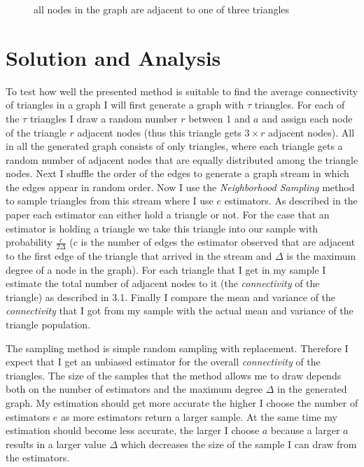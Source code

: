 \documentclass[12pt,twoside,a4paper]{report}
\begin{document}
\begin{figure}
\caption{all nodes in the graph are adjacent to one of three triangles}
\end{figure}
\section{Solution and Analysis}
To test how well the presented method is suitable to find the average connectivity of triangles in a graph I will first generate a graph with $\tau$ triangles. For each of the $\tau$ triangles I draw a random number $r$ between 1 and $a$ and assign each node of the triangle $r$ adjacent nodes (thus this triangle gets $3\times r$ adjacent nodes). All in all the generated graph consists of only triangles, where each triangle gets a random number of adjacent nodes that are equally distributed among the triangle nodes. Next I shuffle the order of the edges to generate a graph stream in which the edges appear in random order. Now I use the \textit{Neighborhood Sampling} method to sample triangles from this stream where I use $e$ estimators. As described in the paper each estimator can either hold a triangle or not. For the case that an estimator is holding a triangle we take this triangle into our sample with probability $\frac{c}{2\Delta}$ ($c$ is the number of edges the	 estimator observed that are adjacent to the first edge of the triangle that arrived in the stream and $\Delta$ is the maximum degree of a node in the graph). For each triangle that I get in my sample I estimate the total number of adjacent nodes to it (the \textit{connectivity} of the triangle) as described in 3.1. Finally I compare the mean and variance of the \textit{connectivity} that I got from my sample with the actual mean and variance of the triangle population.

The sampling method is simple random sampling with replacement. Therefore I expect that I get an unbiased estimator for the overall \textit{connectivity} of the triangles. The size of the samples that the method allows me to draw depends both on the number of estimators and the maximum degree $\Delta$ in the generated graph. My estimation should get more accurate the higher I choose the number of estimators $e$ as more estimators return a larger sample. At the same time my estimation should become less accurate, the larger I choose $a$ because a larger $a$ results in a larger value $\Delta$ which decreases the size of the sample I can draw from the estimators.
\end{document}
